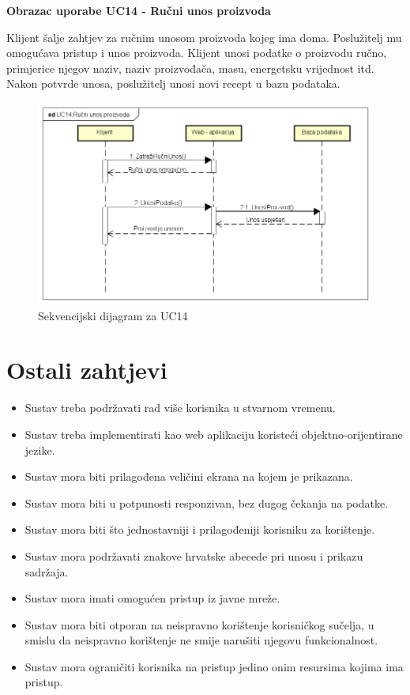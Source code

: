 			\begin{large}{\textbf{Obrazac uporabe UC14 - Ručni unos proizvoda}}\end{large}
			
			Klijent šalje zahtjev za ručnim unosom proizvoda kojeg ima doma. Poslužitelj mu omogućava pristup i unos proizvoda. Klijent unosi podatke o proizvodu ručno, primjerice njegov naziv, naziv proizvođača, masu, energetsku vrijednost itd. Nakon potvrde unosa, poslužitelj unosi novi recept u bazu podataka.
				
					
				\begin{figure}[H]
			\includegraphics[scale=0.4]{dijagrami/SEQ_UC14.png} %
			\centering
			\caption{Sekvencijski dijagram za UC14}
			\label{SEQ_UC14}
		\end{figure}

		\section{Ostali zahtjevi}

			\begin{itemize}
			\item Sustav treba podržavati rad više korisnika u stvarnom vremenu.
			\item Sustav treba implementirati kao web aplikaciju koristeći objektno-orijentirane jezike.
			\item Sustav mora biti prilagođena veličini ekrana na kojem je prikazana.
			\item Sustav mora biti u potpunosti responzivan, bez dugog čekanja na podatke.
			\item Sustav mora biti što jednostavniji i prilagođeniji korisniku za korištenje.
			\item Sustav mora podržavati znakove hrvatske abecede pri unosu i prikazu sadržaja.
			\item Sustav mora imati omogućen pristup iz javne mreže.
			\item Sustav mora biti otporan na neispravno korištenje korisničkog sučelja, u smislu da neispravno korištenje ne smije narušiti njegovu funkcionalnost.
			\item Sustav mora ograničiti korisnika na pristup jedino onim resursima kojima ima pristup.
			\end{itemize}

			 
			 
	